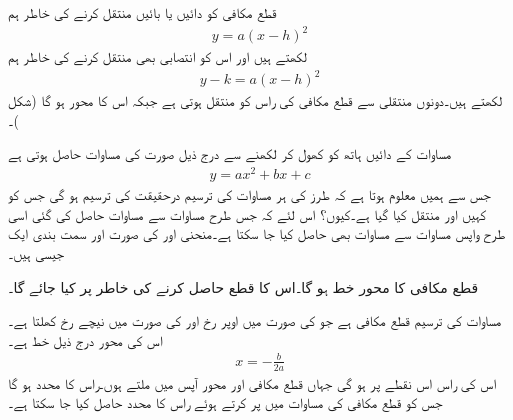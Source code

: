
قطع مکافی  کو دائیں یا بائیں منتقل کرنے کی خاطر ہم
\begin{align}
y=a(x-h)^2
\end{align}
لکھتے ہیں اور اس کو انتصابی بھی منتقل کرنے کی خاطر ہم
\begin{align}\label{مساوات_ابتدا_دو_درجی_الف}
y-k=a(x-h)^2
\end{align}
لکھتے ہیں۔دونوں منتقلی سے قطع مکافی کی راس  کو منتقل ہوتی ہے جبکہ اس کا محور  ہو گا (شکل )۔

مساوات  کے دائیں ہاتھ کو کھول کر لکھنے سے درج ذیل صورت کی مساوات حاصل ہوتی ہے
\begin{align}\label{مساوات_ابتدا_دو_درجی_ب}
y=ax^2+bx+c
\end{align}
جس سے ہمیں معلوم ہوتا ہے کہ  طرز کی ہر مساوات کی ترسیم  درحقیقت  کی ترسیم ہو گی جس کو کہیں اور منتقل کیا گیا ہے۔کیوں؟ اس لئے کہ جس طرح مساوات  سے مساوات  حاصل کی گئی اسی طرح واپس مساوات  سے مساوات  بھی حاصل کیا جا سکتا ہے۔منحنی  اور  کی صورت اور سمت بندی ایک جیسی ہیں۔

قطع مکافی  کا محور خط  ہو گا۔اس کا قطع  حاصل کرنے کی خاطر  پر کیا جائے گا۔

\begin{mdframed}[frametitle={منحنی \عددی{y=ax^2+bx+c,\,\,a\ne 0} کی ترسیم}]
مساوات  کی ترسیم قطع مکافی ہے جو  کی صورت میں اوپر رخ اور  کی صورت میں نیچے رخ کھلتا ہے۔اس کی محور درج ذیل خط ہے۔
\begin{align}
x=-\frac{b}{2a}
\end{align} 
اس کی راس اس نقطے پر ہو گی جہاں قطع مکافی اور محور آپس میں ملتے ہوں۔راس کا  محدد  ہو گا جس کو قطع مکافی کی مساوات میں پر کرتے ہوئے راس کا  محدد حاصل کیا جا سکتا ہے۔
\end{mdframed}

